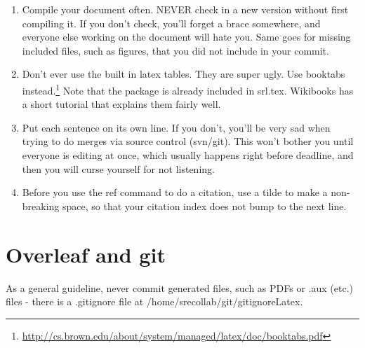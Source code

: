 \documentclass{sigchi}
\begin{document}
\begin{enumerate}

\item
Compile your document often.
NEVER check in a new version without first compiling it.
If you don't check, you'll forget a brace somewhere, and everyone else working on the document will hate you.
Same goes for missing included files, such as figures, that you did not include in your commit.

\item
Don't ever use the built in latex tables.
They are super ugly.
Use booktabs instead.\footnote{\url{http://cs.brown.edu/about/system/managed/latex/doc/booktabs.pdf}}
Note that the package is already included in srl.tex.
Wikibooks has a short tutorial that explains them fairly well.
\item
Put each sentence on its own line.
If you don't, you'll be very sad when trying to do merges via source control (svn/git).
This won't bother you until everyone is editing at once, which usually happens right before deadline, and then you will curse yourself for not listening.

\item
Before you use the ref command to do a citation, use a tilde to make a non-breaking space, so that your citation index does not bump to the next line.

\end{enumerate}

\section{Overleaf and git}

As a general guideline, never commit generated files, such as PDFs or .aux (etc.) files - there is a .gitignore file at /home/srecollab/git/gitignoreLatex.
\end{document}
